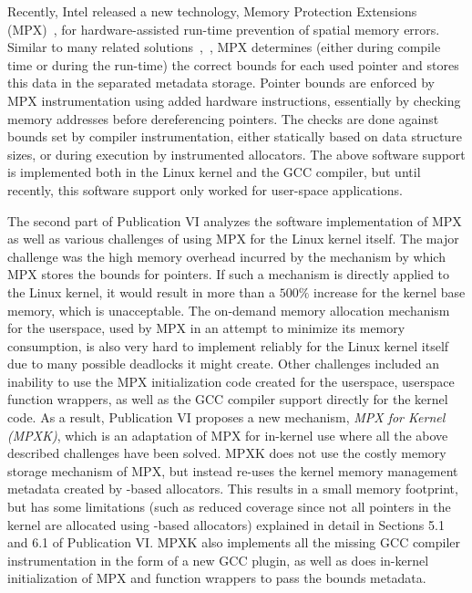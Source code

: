 Recently, Intel released a new technology, \intel Memory Protection Extensions (MPX)~\cite{ramakesavan2015intel}, for hardware-assisted run-time prevention of spatial memory errors.  Similar to many related solutions~\cite{jones1997backwards},~\cite{nagarakatte2009softbound}, MPX determines (either during compile time or during the run-time) the correct bounds for each used pointer and stores this data in the separated metadata storage. Pointer bounds are enforced by MPX instrumentation using added hardware instructions, essentially by checking memory addresses before dereferencing pointers. The checks are done against bounds set by compiler instrumentation, either statically based on data structure sizes, or during execution by instrumented allocators. The above software support is implemented both in the Linux kernel and the GCC compiler, but until recently, this software support only worked for user-space applications. 
 
The second part of Publication VI analyzes the software implementation of \intel MPX as well as various challenges of using MPX for the Linux kernel itself. The major challenge was the high memory overhead incurred by the mechanism by which MPX stores the bounds for pointers. If such a mechanism is directly applied to the Linux kernel, it would result in more than a $500\%$ increase for the kernel base memory, which is unacceptable. The on-demand memory allocation mechanism for the userspace, used by MPX in an attempt to minimize its memory consumption, is also very hard to implement reliably for the Linux kernel itself due to many possible deadlocks it might create. Other challenges included an inability to use the MPX initialization code created for the userspace, userspace function wrappers, as well as the GCC compiler support directly for the kernel code.
As a result, Publication VI proposes a new mechanism, \emph{MPX for Kernel (MPXK)}, which is an adaptation of \intel MPX for in-kernel use where all the above described challenges have been solved. MPXK does not use the costly memory storage mechanism of MPX, but instead re-uses the kernel memory management metadata created by -based allocators. This results in a small memory footprint, but has some limitations (such as reduced coverage since not all pointers in the kernel are allocated using -based allocators) explained in detail in Sections 5.1 and 6.1 of Publication VI. MPXK also implements all the missing GCC compiler instrumentation in the form of a new GCC plugin, as well as does in-kernel initialization of MPX and function wrappers to pass the bounds metadata. 

